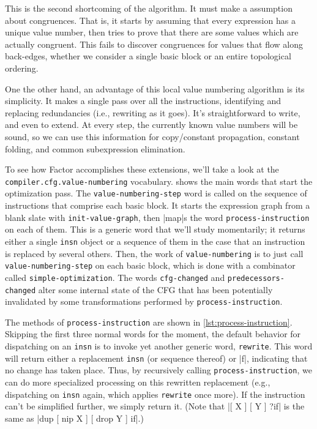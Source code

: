 This is the second shortcoming of the algorithm.  It must make a
 assumption about congruences.  That is, it starts by
assuming that every expression has a unique value number, then tries to prove
that there are some values which are actually congruent.  This fails to
discover congruences for values that flow along back-edges, whether we consider
a single basic block or an entire topological ordering.

One the other hand, an advantage of this local value numbering algorithm is its
simplicity.  It makes a single pass over all the instructions, identifying and
replacing redundancies  (i.e., rewriting as it goes).  It's
straightforward to write, and even to extend.  At every step, the currently
known value numbers will be sound, so we can use this information for
copy/constant propagation, constant folding, and common subexpression
elimination.

\begin{sloppypar}
To see how Factor accomplishes these extensions, we'll take a look at the
\Verb|compiler.cfg.value-numbering| vocabulary.
 shows the main words that start the
optimization pass.  The \Verb|value-numbering-step| word is called on the
sequence of instructions that comprise each basic block.  It starts the
expression graph from a blank slate with \Verb|init-value-graph|, then
\factor|map|s the word \Verb|process-instruction| on each of them.  This is a
generic word that we'll study momentarily; it returns either a single
\Verb|insn| object or a sequence of them in the case that an instruction is
replaced by several others.  Then, the work of \Verb|value-numbering| is to
just call \Verb|value-numbering-step| on each basic block, which is done with a
combinator called \Verb|simple-optimization|.  The words \Verb|cfg-changed| and
\Verb|predecessors-changed| alter some internal state of the \gls{CFG} that has
been potentially invalidated by some transformations performed by
\Verb|process-instruction|.
\end{sloppypar}


The methods of \Verb|process-instruction| are shown in
\vref{lst:process-instruction}.  Skipping the first three normal words for the
moment, the default behavior for dispatching on an \Verb|insn| is to invoke yet
another generic word, \Verb|rewrite|.  This word will return either a
replacement \Verb|insn| (or sequence thereof) or \factor|f|, indicating that no
change has taken place.  Thus, by recursively calling
\Verb|process-instruction|, we can do more specialized processing on this
rewritten replacement (e.g., dispatching on \Verb|insn| again, which applies
\Verb|rewrite| once more).  If the instruction can't be simplified further, we
simply return it.  (Note that
%
\factor|[ X ] [ Y ] ?if|
%
is the same as
%
\factor|dup [ nip X ] [ drop Y ] if|.)

